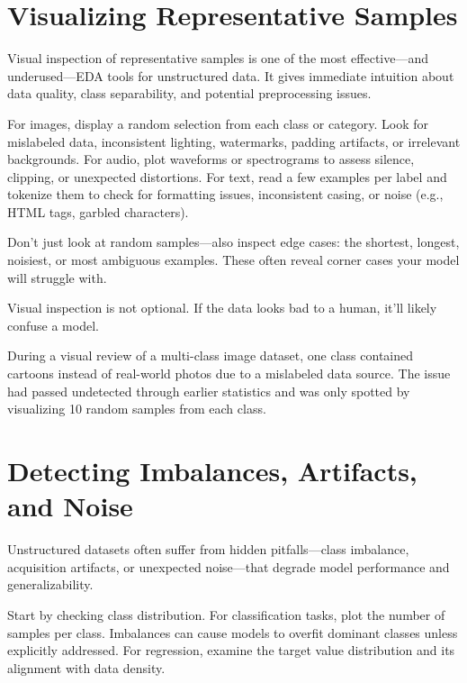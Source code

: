 \documentclass[12pt,openany]{book}
\begin{document}
\section{Visualizing Representative Samples}

Visual inspection of representative samples is one of the most effective—and underused—EDA tools for unstructured data. It gives immediate intuition about data quality, class separability, and potential preprocessing issues.
\newline

For images, display a random selection from each class or category. Look for mislabeled data, inconsistent lighting, watermarks, padding artifacts, or irrelevant backgrounds. For audio, plot waveforms or spectrograms to assess silence, clipping, or unexpected distortions. For text, read a few examples per label and tokenize them to check for formatting issues, inconsistent casing, or noise (e.g., HTML tags, garbled characters).
\newline

Don’t just look at random samples—also inspect edge cases: the shortest, longest, noisiest, or most ambiguous examples. These often reveal corner cases your model will struggle with.
\newline

Visual inspection is not optional. If the data looks bad to a human, it’ll likely confuse a model.

\begin{examplebox}
During a visual review of a multi-class image dataset, one class contained cartoons instead of real-world photos due to a mislabeled data source. The issue had passed undetected through earlier statistics and was only spotted by visualizing 10 random samples from each class.
\end{examplebox}



\section{Detecting Imbalances, Artifacts, and Noise}

Unstructured datasets often suffer from hidden pitfalls—class imbalance, acquisition artifacts, or unexpected noise—that degrade model performance and generalizability.
\newline

Start by checking class distribution. For classification tasks, plot the number of samples per class. Imbalances can cause models to overfit dominant classes unless explicitly addressed. For regression, examine the target value distribution and its alignment with data density.
\newline
\end{document}
